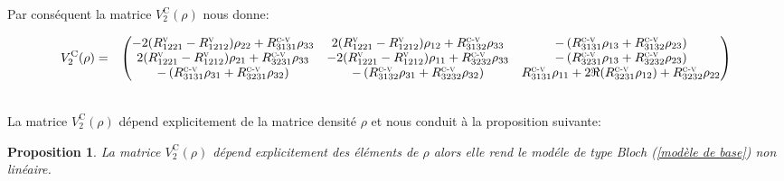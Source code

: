 \documentclass[12pt,a4paper,openany,oneside]{book}
\newtheorem{proposition}{Proposition}[chapter]
\begin{document}
{{{{{{\begin{itemize}[label=$\bullet$]
\end{itemize}
Par conséquent la matrice $ V_{2}^{\textrm{C}}(\rho) $ nous donne:
  \begin{scriptsize}
  \begin{eqnarray*}  
V_{2}^{\textrm{C}}(\rho)  
 & = & \begin{pmatrix}
-2(R^{\textsc{v}}_{1221}-R^{\textsc{v}}_{1212})\rho_{22}+R^{\textsc{c-v}}_{3131}\rho_{33} & 2(R^{\textsc{v}}_{1221}-R^{\textsc{v}}_{1212})\rho_{12}+R^{\textsc{c-v}}_{3132}\rho_{33}   & -\left( R^{\textsc{c-v}}_{3131}\rho_{13}+ R^{\textsc{c-v}}_{3132}\rho_{23}\right)\\
2(R^{\textsc{v}}_{1221}-R^{\textsc{v}}_{1212})\rho_{21}+R^{\textsc{c-v}}_{3231}\rho_{33} & -2(R^{\textsc{v}}_{1221}-R^{\textsc{v}}_{1212})\rho_{11}+R^{\textsc{c-v}}_{3232}\rho_{33}   & -\left( R^{\textsc{c-v}}_{3231}\rho_{13}+ R^{\textsc{c-v}}_{3232}\rho_{23}\right)\\
-\left( R^{\textsc{c-v}}_{3131}\rho_{31}+ R^{\textsc{c-v}}_{3231}\rho_{32}\right) & -\left( R^{\textsc{c-v}}_{3132}\rho_{31}+ R^{\textsc{c-v}}_{3232}\rho_{32}\right) & R^{\textsc{c-v}}_{3131}\rho_{11}+2\Re(R^{\textsc{c-v}}_{3231}\rho_{12})+R^{\textsc{c-v}}_{3232}\rho_{22}                                                                                                 
         \end{pmatrix}
  \end{eqnarray*}     
  \end{scriptsize}\\
  
  La matrice $ V_{2}^{\textrm{C}}(\rho) $ dépend explicitement de la matrice densité $\rho $ et nous conduit à la proposition suivante:
  \begin{proposition}
  La matrice $ V_{2}^{\textrm{C}}(\rho) $ dépend explicitement des éléments de $ \rho $ alors elle rend le modéle de type Bloch (\ref{modèle de base}) non linéaire.
  \end{proposition}
  
}}}}}}
\end{document}
